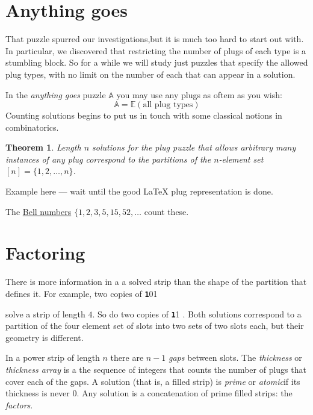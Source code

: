 \documentclass[10pt]{article}
\newtheorem{theorem}{Theorem}
\numberwithin{equation}{section}
\newenvironment{anote}
               {{\textcolor{blue}{Note:}}
                 \itshape
               }
               {}
\newcommand{\plug}[1]{%
\mbox{{\textbf\texttt #1}}
}
\newcommand{\puzzle}[1]{%
   \ensuremath{
   \mathbb{#1}
   }
}
\begin{document}
 \section{Anything goes}
 
That puzzle spurred our investigations,but it is much too hard to start out with. In particular, we discovered that restricting the number of plugs of each type is a stumbling block. So for a while we will study just puzzles that specify the allowed plug types, with no limit on the number of each that can appear in a solution.

In the \emph{anything goes}  puzzle $\puzzle{A}$  you may use any plugs as oftem as you wish:
\begin{equation*}
  \puzzle{A}  = \puzzle{E}(\text{all plug types} )
\end{equation*}
Counting solutions begins to put us in touch with some classical notions
in combinatorics.

\begin{theorem} Length $n$ solutions for the plug
  puzzle that allows arbitrary many instances of any plug
correspond to the partitions of the   $n$-element set $[n] = \{1,2,
\ldots, n \}$. 
\end{theorem}

\begin{anote}
Example here --- wait until the good \LaTeX{} plug representation
  is done.
\end{anote}

The \href{https://en.wikipedia.org/wiki/Bell_number}{Bell numbers}
$\{1, 2, 3, 5, 15, 52, \ldots$  count these.

\section{Factoring}

There is more information in a a solved  strip than the shape of
the partition that defines it. For example, two copies of \plug{101}
solve a strip of length $4$. So do two copies of \plug{11}. Both solutions correspond to a partition of the four element set of slots
into two sets of two slots each, but their geometry is different.

In a  power strip of length $n$ there are $n-1$ \emph{gaps} between
slots. The \emph{thickness} or \emph{thickness array} is a the
sequence of integers that counts the number of plugs that cover each
of the gaps. A solution (that is, a filled strip) is \emph{prime} or \emph{atomic}if
its thickness is never $0$. Any solution is a concatenation of prime
filled strips: the \emph{factors}.
\end{document}
